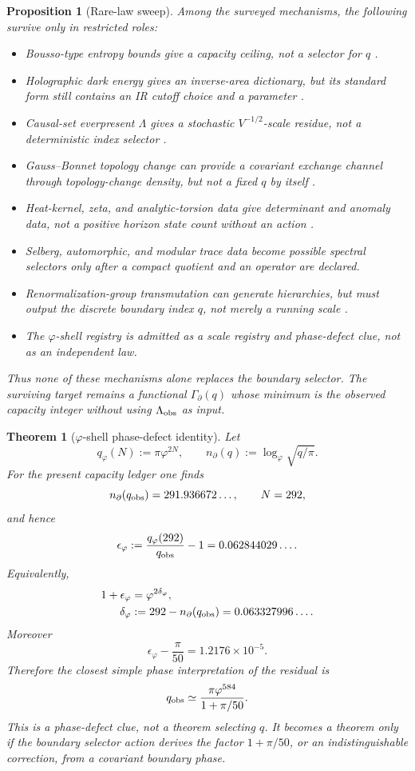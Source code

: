 \documentclass[aps,prd,reprint,nofootinbib,superscriptaddress,floatfix]{revtex4-2}
\numberwithin{equation}{section}
\theoremstyle{definition}
\theoremstyle{plain}
\newtheorem{theorem}{Theorem}[section]
\newtheorem{proposition}{Proposition}[section]
\begin{document}
\begin{proposition}[Rare-law sweep]
Among the surveyed mechanisms, the following survive only in restricted
roles:
\begin{itemize}
\item Bousso-type entropy bounds give a capacity ceiling, not a selector
for \(q\) \cite{Bousso2002}.
\item Holographic dark energy gives an inverse-area dictionary, but its
standard form still contains an IR cutoff choice and a parameter
\cite{Li2004}.
\item Causal-set everpresent \(\Lambda\) gives a stochastic
\(V^{-1/2}\)-scale residue, not a deterministic index selector
\cite{Sorkin2007,Zwane2017}.
\item Gauss--Bonnet topology change can provide a covariant exchange
channel through topology-change density, but not a fixed \(q\) by itself
\cite{Tsilioukas2024}.
\item Heat-kernel, zeta, and analytic-torsion data give determinant and
anomaly data, not a positive horizon state count without an action
\cite{Vassilevich2003,RaySinger1971}.
\item Selberg, automorphic, and modular trace data become possible
spectral selectors only after a compact quotient and an operator are
declared.
\item Renormalization-group transmutation can generate hierarchies, but
must output the discrete boundary index \(q\), not merely a running scale
\cite{Saueressig2023}.
\item The \(\varphi\)-shell registry is admitted as a scale registry and
phase-defect clue, not as an independent law.
\end{itemize}
Thus none of these mechanisms alone replaces the boundary selector.
The surviving target remains a functional \(\Gamma_\partial(q)\) whose
minimum is the observed capacity integer without using \(\Lambda_{\rm obs}\)
as input.
\end{proposition}

\begin{theorem}[\(\varphi\)-shell phase-defect identity]
Let
\[
q_\varphi(N):=\pi\varphi^{2N},
\qquad
n_\partial(q):=\log_\varphi\sqrt{q/\pi}.
\]
For the present capacity ledger one finds
\[
n_\partial(q_{\rm obs})=291.936672\ldots,
\qquad
N=292,
\]
and hence
\[
\epsilon_\varphi:=\frac{q_\varphi(292)}{q_{\rm obs}}-1
=0.062844029\ldots .
\]
Equivalently,
\begin{align}
1+\epsilon_\varphi&=\varphi^{2\delta_\varphi},\\
\delta_\varphi&:=292-n_\partial(q_{\rm obs})
=0.063327996\ldots .
\end{align}
Moreover
\[
\epsilon_\varphi-\frac{\pi}{50}=1.2176\times10^{-5}.
\]
Therefore the closest simple phase interpretation of the residual is
\[
q_{\rm obs}
\simeq
\frac{\pi\varphi^{584}}{1+\pi/50}.
\]
This is a phase-defect clue, not a theorem selecting \(q\).  It becomes
a theorem only if the boundary selector action derives the factor
\(1+\pi/50\), or an indistinguishable correction, from a covariant
boundary phase.
\end{theorem}
\end{document}
